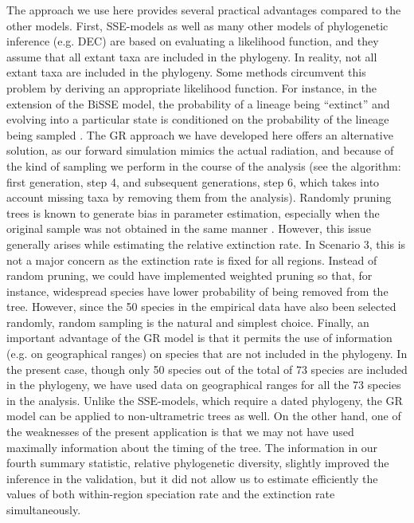 The approach we use here provides several practical advantages compared to the other models. 
First, SSE-models as well as many other models of phylogenetic inference (e.g. DEC) are based on evaluating a likelihood function, and they assume that all extant taxa are included in the phylogeny. 
In reality, not all extant taxa are included in the phylogeny. 
Some methods circumvent this problem by deriving an appropriate likelihood function. 
For instance, in the extension of the BiSSE model, the probability of a lineage being “extinct”  and evolving into a particular state is conditioned on the probability of the lineage being sampled \citep{FitzJohn2009}. 
The GR approach we have developed here offers an alternative solution, as our forward simulation mimics the actual radiation, and because of the kind of sampling we perform in the course of the analysis (see the algorithm: first generation, step 4, and subsequent generations, step 6, which takes into account missing taxa by removing them from the analysis). Randomly pruning trees is known to generate bias in parameter estimation, especially when the original sample was not obtained in the same manner \citep{Hohna2011}. 
However, this issue generally arises while estimating the relative extinction rate. 
In Scenario 3, this is not a major concern as the extinction rate is fixed for all regions. 
Instead of random pruning, we could have implemented weighted pruning so that, for instance, widespread species have lower probability of being removed from the tree. 
However, since the 50 species in the empirical data have also been selected randomly, random sampling is the natural and simplest choice. 
Finally, an important advantage of the GR model is that it permits the use of information (e.g. on geographical ranges) on species that are not included in the phylogeny. 
In the present case, though only 50 species out of the total of 73 species are included in the phylogeny, we have used data on geographical ranges for all the 73 species in the analysis. Unlike the SSE-models, which require a dated phylogeny, the GR model can be applied to non-ultrametric trees as well. 
On the other hand, one of the weaknesses of the present application is that we may not have used maximally information about the timing of the tree. 
The information in our fourth summary statistic, relative phylogenetic diversity, slightly improved the inference in the validation, but it did not allow us to estimate efficiently the values of both within-region speciation rate and the extinction rate simultaneously. 

